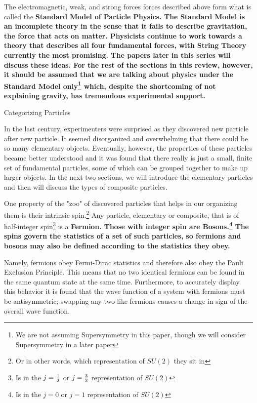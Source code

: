 \documentclass[12pt,epsf]{article}
\makeatletter
\def\subsection{\@startsection{subsection}{2}{\z@}{2.3ex plus .2ex}
 {2.3ex plus .2ex}{\bf}}
\makeatother
\begin{document}
The electromagnetic, weak, and strong forces forces described above
form what is called the \bf Standard Model of Particle Physics\rm.  The
Standard Model is an incomplete theory in the sense that it fails to
describe gravitation, the force that acts on matter.  Physicists
continue to work towards a theory that describes all four fundamental
forces, with String Theory currently the most promising.  The papers
later in this series will discuss these ideas.	For the rest of the
sections in this review, however, it should be assumed that we are
talking about physics under the Standard Model only\footnote{We are not
assuming Supersymmetry in this paper, though we will consider
Supersymmetry in a later paper} which, despite the shortcoming of not
explaining gravity, has tremendous experimental support. 

\subsection{Categorizing Particles}

In the last century, experimenters were surprised as they discovered
new particle after new particle.  It seemed disorganized and
overwhelming that there could be so many elementary objects. 
Eventually, however, the properties of these particles became better
understood and it was found that there really is just a small, finite
set of fundamental particles, some of which can be grouped together to
make up larger objects.  In the next two sections, we will introduce
the elementary particles and then will discuss the types of composite
particles. 

One property of the "zoo" of discovered particles that helps in our
organizing them is their intrinsic spin.\footnote{Or in other words,
which representation of $SU(2)$ they sit in}  Any particle,
elementary or composite, that is of half-integer spin\footnote{Is in
the $j={1\over 2}$ or $j={3\over 2}$ representation of $SU(2)$} is a
\bf Fermion\rm.  Those with integer spin are \bf Bosons\rm.\footnote{Is
in the $j=0$ or $j=1$ representation of $SU(2)$}  The spins govern the
statistics of a set of such particles, so fermions and bosons may also
be defined according to the statistics they obey. 

Namely, fermions obey Fermi-Dirac statistics and therefore also obey the
Pauli Exclusion Principle.  This means that no two identical fermions can be
found in the same quantum state at the same time.  Furthermore, to
accurately display this behavior it is found that the wave function of
a system with fermions must be antisymmetric; swapping any two like
fermions causes a change in sign of the overall wave function.
\end{document}
